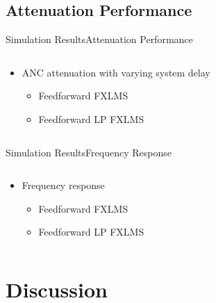 \subsection{Attenuation Performance}
\begin{frame}{Simulation Results}{Attenuation Performance}		
\begin{columns}
	\begin{column}{0.4\textwidth}
	\begin{itemize}
		\item ANC attenuation with varying system delay
		\begin{itemize}
			\item Feedforward FXLMS 
			\item Feedforward LP FXLMS 
		\end{itemize}
	\end{itemize}
	\end{column}
	\begin{column}{0.6\textwidth} 
		\resizebox{0.9\columnwidth}{!}{		
			}
	\end{column}
\end{columns}
\end{frame}






\begin{frame}{Simulation Results}{Frequency Response}		
\begin{columns}
	\begin{column}{0.4\textwidth}
		\begin{itemize}
			\item Frequency response
			\begin{itemize}
				\item Feedforward FXLMS 
				\item Feedforward LP FXLMS 
			\end{itemize}
		\end{itemize}
	\end{column}
	\begin{column}{0.6\textwidth} 
		\resizebox{0.9\columnwidth}{!}{		
			}
	\end{column}
\end{columns}
\end{frame}


\section{Discussion}
